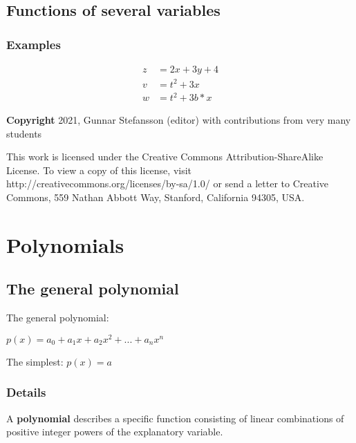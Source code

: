 \documentclass[12pt,a4paper]{article}
\theoremstyle{regla}
\theoremstyle{remark}
\theoremstyle{definition}
\theoremstyle{nonumberbreak}
\begin{document}
\subsection{Functions of several variables}
\subsubsection{Examples}
\begin{xmpl}
\begin{align}
z &= 2x+3y+4\\
v &= t^2+3x\\
w &= t^2+3b*x
\end{align}
\end{xmpl}

{\bf Copyright}
2021, Gunnar Stefansson (editor) with contributions from very many students

This work is licensed under the Creative Commons
Attribution-ShareAlike License. To view a copy of this license, visit
http://creativecommons.org/licenses/by-sa/1.0/ or send a letter to
Creative Commons, 559 Nathan Abbott Way, Stanford, California 94305,
USA.
\clearpage
\section{Polynomials}
\subsection{The general polynomial}
\begin{fbox}
\begin{minipage}{0.97\textwidth}
The general polynomial:
 
$p(x)=a_{0}+a_{1}x+a_{2}x^{2}+...+a_{n}x^{n}$

The simplest:
$p(x)=a$
\end{minipage}
\end{fbox}
\subsubsection{Details}
\begin{defn}
A {\bf polynomial} describes a specific function consisting of linear combinations of positive integer powers of the explanatory variable. 
\end{defn}
\end{document}
